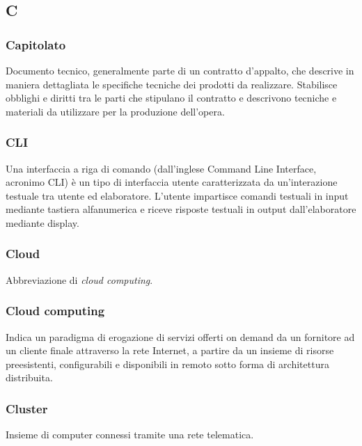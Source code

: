 \subsection*{\textbf{\hfill \Huge{C} \hfill}} 
\subsubsection*{Capitolato}
Documento tecnico, generalmente parte di un contratto d’appalto, che descrive in maniera dettagliata le specifiche tecniche dei prodotti da realizzare. Stabilisce obblighi e diritti tra le parti che stipulano il contratto e descrivono tecniche e materiali da utilizzare per la produzione dell’opera.
\subsubsection*{CLI}
Una interfaccia a riga di comando (dall’inglese Command Line Interface, acronimo CLI) è un tipo di interfaccia utente caratterizzata da un’interazione testuale tra utente ed elaboratore. L’utente impartisce comandi testuali in input mediante tastiera alfanumerica e riceve risposte testuali in output dall’elaboratore mediante display.
\subsubsection*{Cloud}
Abbreviazione di \textit{cloud computing}\glos .
\subsubsection*{Cloud computing}
Indica un paradigma di erogazione di servizi offerti on demand da un fornitore ad un cliente finale attraverso la rete Internet, a partire da un insieme di risorse preesistenti, configurabili e disponibili in remoto sotto forma di architettura distribuita.
\subsubsection*{Cluster}
Insieme di computer connessi tramite una rete telematica.
